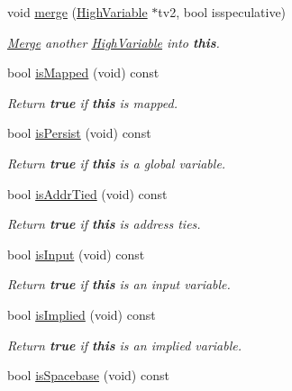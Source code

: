 \begin{DoxyCompactItemize}
void \mbox{\hyperlink{class_high_variable_a891fb98039d17be9ad7b5b618300fef2}{merge}} (\mbox{\hyperlink{class_high_variable}{High\+Variable}} $\ast$tv2, bool isspeculative)
\begin{DoxyCompactList}\small\item\em \mbox{\hyperlink{class_merge}{Merge}} another \mbox{\hyperlink{class_high_variable}{High\+Variable}} into {\bfseries{this}}. \end{DoxyCompactList}\item 
bool \mbox{\hyperlink{class_high_variable_abdda61fee37bd45139d757317876cab1}{is\+Mapped}} (void) const
\begin{DoxyCompactList}\small\item\em Return {\bfseries{true}} if {\bfseries{this}} is mapped. \end{DoxyCompactList}\item 
bool \mbox{\hyperlink{class_high_variable_aab5ac9fbe44f985d9ff2440ae0bbfaa1}{is\+Persist}} (void) const
\begin{DoxyCompactList}\small\item\em Return {\bfseries{true}} if {\bfseries{this}} is a global variable. \end{DoxyCompactList}\item 
bool \mbox{\hyperlink{class_high_variable_ab6344b0a90cd3b1f7371541ec0c77255}{is\+Addr\+Tied}} (void) const
\begin{DoxyCompactList}\small\item\em Return {\bfseries{true}} if {\bfseries{this}} is {\itshape address} {\itshape ties}. \end{DoxyCompactList}\item 
bool \mbox{\hyperlink{class_high_variable_afdf95522df96248264289c1b6b8df2e8}{is\+Input}} (void) const
\begin{DoxyCompactList}\small\item\em Return {\bfseries{true}} if {\bfseries{this}} is an input variable. \end{DoxyCompactList}\item 
bool \mbox{\hyperlink{class_high_variable_a0a5807c7fb340913980697f56a495011}{is\+Implied}} (void) const
\begin{DoxyCompactList}\small\item\em Return {\bfseries{true}} if {\bfseries{this}} is an implied variable. \end{DoxyCompactList}\item 
bool \mbox{\hyperlink{class_high_variable_a5a0d90d626d382e4e8b96e34b6e46cf1}{is\+Spacebase}} (void) const

\end{DoxyCompactItemize}
